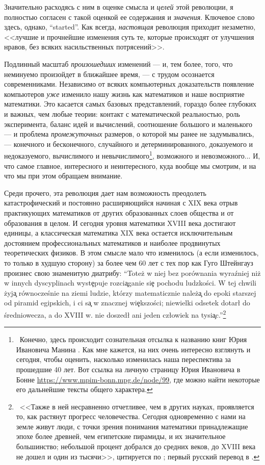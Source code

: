 \documentclass[intlimits,twoside,a4paper,11pt]{article}
\begin{document}
	Значительно расходясь с ним в оценке смысла и {\it целей\/} этой революции,
	я полностью согласен с такой оценкой ее содержания и {\it значения\/}. 
	Ключевое слово здесь, однако, ``started''. Как всегда, {\it настоящая\/}
	революция приходит незаметно, <<лучшие и прочнейшие изменения суть те, 
	которые происходят от улучшения нравов, без всяких насильственных 
	потрясений>>. 
	\par
	Подлинный масштаб {\it произошедших\/} изменений --- и, тем более,
	того, что неминуемо произойдет в ближайшее время, ---  с трудом осознается 
	современниками. Независимо от всяких компьютерных доказательств
	появление компьютеров {\it уже\/} изменило нашу жизнь как математиков
	и наше восприятие математики. Это касается самых базовых представлений,
	гораздо более глубоких и важных, чем любые теории: контакт с математической
	реальностью, роль эксперимента, баланс идей и вычислений,
	соотношение большого и маленького --- и проблема {\it промежуточных\/} 
	размеров, о которой мы ранее не задумывались, --- конечного и бесконечного, 
	случайного и детерминированного, доказуемого и недоказуемого, вычислимого 
	и невычислимого\footnote{~Конечно, здесь происходит сознательная отсылка 
		к названию книг Юрия Ивановича Манина \cite{M1,M2}. Как мне кажется,
		на них очень интересно взглянуть и сегодня, чтобы оценить, насколько изменилась 
		наша переспектива за прошедшие 40 лет. Вот ссылка на личную страницу Юрия
		Ивановича в Бонне \url{https://www.mpim-bonn.mpg.de/node/99}, где можно найти
		некоторые его дальнейшие тексты общего характера.}, возможного и невозможного... 
	И, что самое главное, интересного и неинтересного, куда вообще мы смотрим, 
	и на что мы при этом обращаем внимание.
	\par
	Среди прочего, эта революция дает нам возможность преодолеть 
	катастрофический и постоянно расширяющийся начиная с XIX века отрыв практикующих 
	математиков от других образованных слоев общества и от образования в целом.
	И сегодня уровня математики XVIII века достигают единицы,
	а классическая математика XIX века остается исключительным достоянием 
	профессиональных математиков и наиболее продвинутых теоретических физиков.
	В этом смысле мало что изменилось (а если изменилось, то только в худшую сторону) 
	за более чем 60 лет с тех пор как Гуго Штейнгауз произнес свою знаменитую диатрибу: 
	``Tote\.{z} w niej bez por\'ownania wyra\'zniej ni\.{z} w innych dyscyplinach
	wyst\c{e}puje rozci\c{a}ganie si\c{e} pochodu ludzko\'sci.
	W tej chwili \.{z}yj\c{a} 
	r\'ownocze\'{s}nie na ziemi ludzie, kt\'orzy matematicznie 
	nale\.{z}\c{a} do epoki starszej od piramid egipskich, i ci s\c{a} w znacznej 
	wi\c{e}kszo\'sci; niewielki odsetek dotar\l{} do \'sredniowecza, a do XVIII w. nie 
	doszed\l{} ani jeden cz\l{}owiek na tysi\c{a}c.''\footnote{~<<Также в ней несравненно
		отчетливее, чем в других науках, проявляется то, как растянут прогресс
		человечества. Сегодня одновременно с нами на земле живут люди, с точки
		зрения понимания математики принадлежащие эпохе более древней, чем 
		египетские пирамиды, и их значительное большинство; небольшой процент
		добрался до средних веков,  до XVIII века не дошел и один из тысячи>>,
		цитируется по \cite[p. 32]{St}; первый русский перевод в \cite[c. 375]{St1}. }
	\par
	
\end{document}
